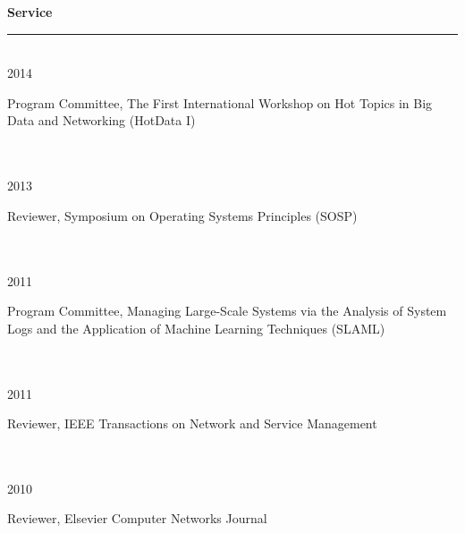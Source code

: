 \documentclass[11pt]{article}
\newcommand{\parwidth}{5.3 in}
\newcommand{\pagewidth}{6.8 in}
\newcommand{\tabwidth}{1.5 in}
\newcommand{\head}[1]{
{\bf #1} \\
\rule{\textwidth}{0.01 in}

\vspace{-0.35 in}

}
\begin{document}

\head{Service}

\begin{tabbing}
\hspace{\tabwidth} \= \\
2014 \> \parbox[t]{\parwidth}{Program Committee, The First International Workshop on Hot Topics in Big Data and Networking (HotData I)}\\ \\
2013 \> \parbox[t]{\parwidth}{Reviewer, Symposium on Operating Systems Principles (SOSP)}\\ \\
2011 \> \parbox[t]{\parwidth}{Program Committee, Managing Large-Scale Systems via the Analysis of System Logs and the Application of Machine Learning Techniques (SLAML)}\\ \\
2011 \> \parbox[t]{\parwidth}{Reviewer, IEEE Transactions on Network and Service Management}\\ \\
2010 \> \parbox[t]{\parwidth}{Reviewer, Elsevier Computer Networks Journal}

\end{tabbing}
\end{document}
